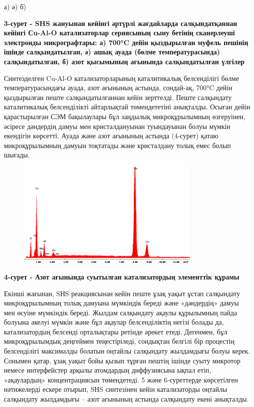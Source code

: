 а) ә) б)

{\bfseries 3-сурет - SHS жануынан кейінгі әртүрлі жағдайларда
салқындатқаннан кейінгі Сu-Al-O катализаторлар сериясының сыну бетінің
сканерлеуші электронды микрографтары: а) 700°C дейін қыздырылған муфель
пешінің ішінде салқындатылған, ә) ашық ауада (бөлме температурасында)
салқындатылған, б) азот қысымының ағынында салқындатылған үлгілер}

Синтезделген Cu-Al-O катализаторларының каталитикалық белсенділігі бөлме
температурасындағы ауада, азот ағынының астында, сондай-ақ, 700°C дейін
қыздырылған пеште салқындатылғаннан кейін зерттелді. Пеште салқындату
каталитикалық белсенділікті айтарлықтай төмендететіні анықталды. Осыған
дейін қарастырылған СЭМ бақылаулары бұл заңдылық микроқұрылымның
өзгеруінен, әсіресе дәндердің дамуы мен кристалдануынан туындауынан
болуы мүмкін екендігін көрсетті. Ауада және азот ағынының астында
(4-сурет) қатаю микроқұрылымның дамуын тоқтатады және кристалдану толық
емес болып шығады.

\begin{figure}[H]
	\centering
	\includegraphics[width=0.8\textwidth]{assets/74}
	\caption*{}
\end{figure}

{\bfseries 4-сурет - Азот ағынында суытылған катализатордың элементтік
құрамы}

Екінші жағынан, SНS реакциясынан кейін пеште ұзақ уақыт ұстап салқындату
микроқұрылымның толық дамуына мүмкіндік береді және «дәндердің» дамуы
мен өсуіне мүмкіндік береді. Жылдам салқындату ақаулы құрылымның пайда
болуына әкелуі мүмкін және бұл ақаулар белсенділіктің негізі болады да,
катализатордың белсенді орталықтары ретінде әрекет етеді. Дегенмен, бұл
микроқұрылымдық деңгеймен теңестіріледі, сондықтан белгілі бір процестің
белсенділігі максималды болатын оңтайлы салқындату жылдамдығы болуы
керек. Сонымен қатар, ұзақ уақыт бойы қызып тұрған пештің ішінде суыту
микротор немесе интерфейстер арқылы атомдардың диффузиясына ықпал етіп,
«ақаулардың» концентрациясын төмендетеді. 5 және 6-суреттерде
көрсетілген нәтижелерді ескере отырып, SНS синтезінен кейін
катализаторды оңтайлы салқындату жылдамдығы -- азот ағынының астында
салқындату екені анықталды.

